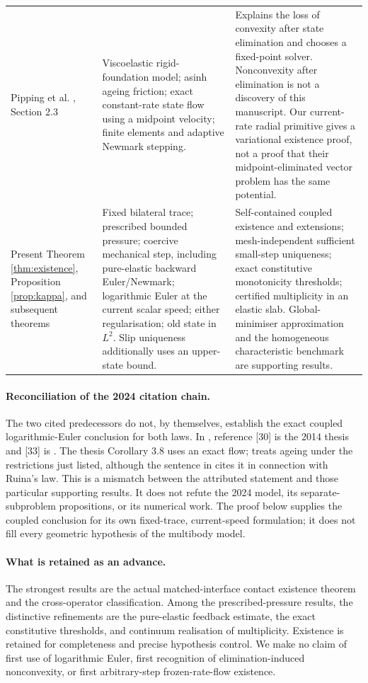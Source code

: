 \documentclass[11pt,a4paper]{article}
\theoremstyle{definition}\newtheorem{definition}[theorem]{Definition}
\theoremstyle{remark}\newtheorem{remark}[theorem]{Remark}
\numberwithin{equation}{section}
\begin{document}
\begin{longtable}{>{\raggedright\arraybackslash}p{.20\linewidth}>{\raggedright\arraybackslash}p{.35\linewidth}>{\raggedright\arraybackslash}p{.39\linewidth}}
Pipping et al. \cite{PKRO}, Section 2.3
& Viscoelastic rigid-foundation model; asinh ageing friction; exact constant-rate state flow using a midpoint velocity; finite elements and adaptive Newmark stepping.
& Explains the loss of convexity after state elimination and chooses a fixed-point solver. Nonconvexity after elimination is not a discovery of this manuscript. Our current-rate radial primitive gives a variational existence proof, not a proof that their midpoint-eliminated vector problem has the same potential.\\[5pt]
Present Theorem \ref{thm:existence}, Proposition \ref{prop:kappa}, and subsequent theorems
& Fixed bilateral trace; prescribed bounded pressure; coercive mechanical step, including pure-elastic backward Euler/Newmark; logarithmic Euler at the current scalar speed; either regularisation; old state in $L^2$. Slip uniqueness additionally uses an upper-state bound.
& Self-contained coupled existence and extensions; mesh-independent sufficient small-step uniqueness; exact constitutive monotonicity thresholds; certified multiplicity in an elastic slab. Global-minimiser approximation and the homogeneous characteristic benchmark are supporting results.\\
\end{longtable}
\endgroup

\paragraph{Reconciliation of the 2024 citation chain.}
The two cited predecessors do not, by themselves, establish the exact coupled logarithmic-Euler conclusion for both laws. In \cite{GKP}, reference [30] is the 2014 thesis and [33] is \cite{PSK}. The thesis Corollary 3.8 uses an exact flow; \cite[Theorem 5.14]{PSK} treats ageing under the restrictions just listed, although the sentence in \cite[Section 3.3]{GKP} cites it in connection with Ruina's law. This is a mismatch between the attributed statement and those particular supporting results. It does not refute the 2024 model, its separate-subproblem propositions, or its numerical work. The proof below supplies the coupled conclusion for its own fixed-trace, current-speed formulation; it does not fill every geometric hypothesis of the multibody model.

\paragraph{What is retained as an advance.}
The strongest results are the actual matched-interface contact existence theorem and the cross-operator classification. Among the prescribed-pressure results, the distinctive refinements are the pure-elastic feedback estimate, the exact constitutive thresholds, and continuum realisation of multiplicity. Existence is retained for completeness and precise hypothesis control. We make no claim of first use of logarithmic Euler, first recognition of elimination-induced nonconvexity, or first arbitrary-step frozen-rate-flow existence.
\end{document}
